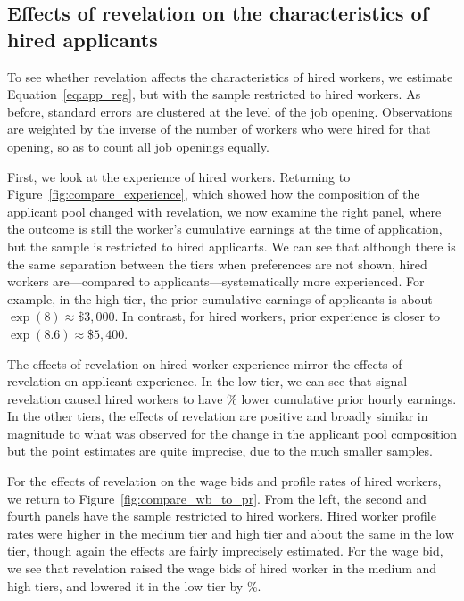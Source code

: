 \documentclass[12pt]{article}
\begin{document}
\subsection{Effects of revelation on the characteristics of hired applicants}
To see whether revelation affects the characteristics of hired workers, we estimate Equation~\ref{eq:app_reg}, but with the sample restricted to hired workers.
As before, standard errors are clustered at the level of the job opening.
Observations are weighted by the inverse of the number of workers who were hired for that opening, so as to count all job openings equally. 

First, we look at the experience of hired workers. 
Returning to Figure~\ref{fig:compare_experience}, which showed how the composition of the applicant pool changed with revelation, we now examine the right panel, where the outcome is still the  worker's cumulative earnings at the time of application, but the sample is restricted to hired applicants.
We can see that although there is the same separation between the tiers when preferences are not shown, hired workers are---compared to applicants---systematically more experienced.
For example, in the high tier, the prior cumulative earnings of applicants is about $\exp(8) \approx \$3,000$.
In contrast, for hired workers, prior experience is closer to $\exp(8.6) \approx \$5,400$.

The effects of revelation on hired worker experience mirror the effects of revelation on applicant experience.
In the low tier, we can see that signal revelation caused hired workers to have \EffectEarningsExperienceLowTierHiredRegression{}\% lower cumulative prior hourly earnings.
In the other tiers, the effects of revelation are positive and broadly similar in magnitude to what was observed for the change in the applicant pool composition but the point estimates are quite imprecise, due to the much smaller samples. 

For the effects of revelation on the wage bids and profile rates of hired workers, we return to Figure~\ref{fig:compare_wb_to_pr}.
From the left, the second and fourth panels have the sample restricted to hired workers. 
Hired worker profile rates were higher in the medium tier and high tier and about the same in the low tier, though again the effects are fairly imprecisely estimated.
For the wage bid, we see that revelation raised the wage bids of hired worker in the medium and high tiers, and lowered it in the low tier by \EffectWageBidAppLowTierHiredRegression{}\%. 
\end{document}
